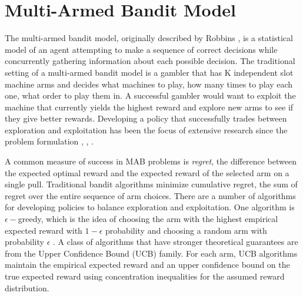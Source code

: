 \documentclass[journal,transmag]{IEEEtran}%
\begin{document}
\section{Multi-Armed Bandit Model}
The multi-armed bandit model, originally described by Robbins \cite{robbins1985some}, is a statistical model of an agent attempting to make a sequence of correct decisions while concurrently gathering information about each possible decision.
The traditional setting of a multi-armed bandit model is a gambler that has K independent slot machine arms and decides what machines to play, how many times to play each one, what order to play them in.
A successful gambler would want to exploit the machine that currently yields the highest reward and explore new arms to see if they give better rewards.
Developing a policy that successfully trades between exploration and exploitation has been the focus of extensive research since the problem formulation \cite{bubeck2009pure}, \cite{robbins1985some}, \cite{bergemann2006bandit}.

A common measure of success in MAB problems is {\it regret}, the difference between the expected optimal reward and the expected reward of the selected arm on a single pull.
Traditional bandit algorithms minimize cumulative regret,  the sum of regret over the entire sequence of arm choices. There are a number of algorithms for developing policies to balance exploration and exploitation.
One algorithm is $\epsilon-$greedy, which is the idea of choosing the arm with the highest empirical expected reward with $1-\epsilon$ probability and choosing a random arm with probability $\epsilon$ \cite{barto1998reinforcement}.
A class of algorithms that have stronger theoretical guarantees are from the Upper Confidence Bound (UCB) family.
For each arm, UCB algorithms maintain the empirical expected reward and an upper confidence bound on the true expected reward using concentration inequalities for the assumed reward distribution.

\end{document}
